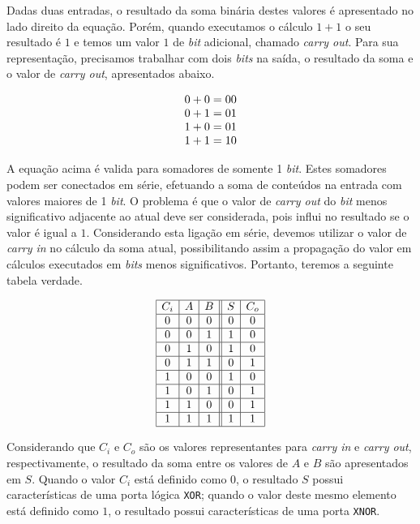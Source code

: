 \documentclass{article}
\begin{document}
Dadas duas entradas, o resultado da soma binária destes valores é apresentado no
lado direito da equação. Porém, quando executamos o cálculo $1+1$ o seu
resultado é $1$ e temos um valor $1$ de \textit{bit} adicional, chamado
\textit{carry out}. Para sua representação, precisamos trabalhar com dois
\textit{bits} na saída, o resultado da soma e o valor de \textit{carry out},
apresentados abaixo.

\begin{equation*}
    \begin{array}[b]{r}
        0+0=00\\
        0+1=01\\
        1+0=01\\
        1+1=10
    \end{array}
\end{equation*}

A equação acima é valida para somadores de somente 1 \textit{bit}. Estes
somadores podem ser conectados em série, efetuando a soma de conteúdos na
entrada com valores maiores de 1 \textit{bit}. O problema é que o valor de
\textit{carry out} do \textit{bit} menos significativo adjacente ao atual deve
ser considerada, pois influi no resultado se o valor é igual a $1$. Considerando
esta ligação em série, devemos utilizar o valor de \textit{carry in} no cálculo
da soma atual, possibilitando assim a propagação do valor em cálculos executados
em \textit{bits} menos significativos. Portanto, teremos a seguinte tabela
verdade.

\begin{equation*}
    \begin{array}{|c|c|c||c|c|}
        \hline C_i & A & B & S & C_o\\
        \hline 0 & 0 & 0 & 0 & 0\\
        \hline 0 & 0 & 1 & 1 & 0\\
        \hline 0 & 1 & 0 & 1 & 0\\
        \hline 0 & 1 & 1 & 0 & 1\\
        \hline 1 & 0 & 0 & 1 & 0\\
        \hline 1 & 0 & 1 & 0 & 1\\
        \hline 1 & 1 & 0 & 0 & 1\\
        \hline 1 & 1 & 1 & 1 & 1\\
        \hline
    \end{array}
\end{equation*}

Considerando que $C_i$ e $C_o$ são os valores representantes para
\textit{carry in} e \textit{carry out}, respectivamente, o resultado da soma
entre os valores de $A$ e $B$ são apresentados em $S$. Quando o valor $C_i$ está
definido como $0$, o resultado $S$ possui características de uma porta lógica
\texttt{XOR}; quando o valor deste mesmo elemento está definido como $1$, o
resultado possui características de uma porta \texttt{XNOR}.
\end{document}
